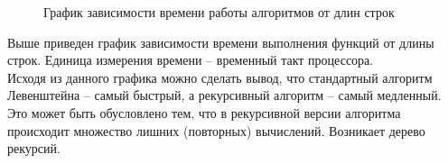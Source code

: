 \documentclass[a4paper,12pt]{article}
\begin{document}
\begin{figure}[h]
\caption{График зависимости времени работы алгоритмов от длин строк}
\label{images:graphics}
\end{figure}

Выше приведен график зависимости времени выполнения функций от длины строк. Единица измерения времени – временный такт процессора. \\

Исходя из данного графика можно сделать вывод, что стандартный алгоритм Левенштейна – самый быстрый, а рекурсивный алгоритм – самый медленный. Это может быть обусловлено тем, что в рекурсивной версии алгоритма происходит множество лишних (повторных) вычислений. Возникает дерево рекурсий. \\

\newpage
\end{document}
